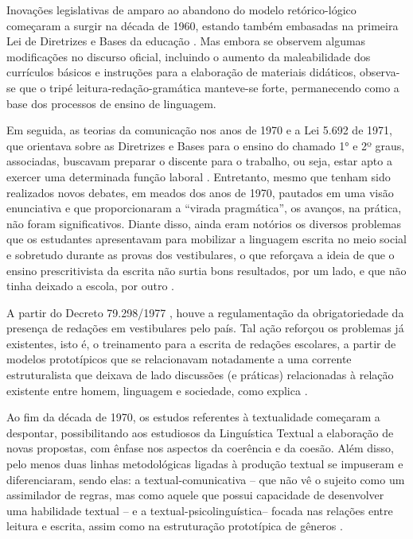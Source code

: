 \documentclass[portuguese]{textolivre}
\begin{document}
Inovações legislativas de amparo ao abandono do modelo retórico-lógico começaram a surgir na década de 1960, estando também embasadas na primeira Lei de Diretrizes e Bases da educação \cite{brasil_lei_1961}. Mas embora se observem algumas modificações no discurso oficial, incluindo o aumento da maleabilidade dos currículos básicos e instruções para a elaboração de materiais didáticos, observa-se que o tripé leitura-redação-gramática manteve-se forte, permanecendo como a base dos processos de ensino de linguagem.  

Em seguida, as teorias da comunicação nos anos de 1970 e a Lei 5.692 de 1971, que orientava sobre as Diretrizes e Bases para o ensino do chamado 1° e 2º graus, associadas, buscavam preparar o discente para o trabalho, ou seja, estar apto a exercer uma determinada função laboral \cite{vicentini_redaco_2015}. Entretanto, mesmo que tenham sido realizados novos debates, em meados dos anos de 1970, pautados em uma visão enunciativa e que proporcionaram a “virada pragmática”, os avanços, na prática, não foram significativos. Diante disso, ainda eram notórios os diversos problemas que os estudantes apresentavam para mobilizar a linguagem escrita no meio social e sobretudo durante as provas dos vestibulares, o que reforçava a ideia de que o ensino prescritivista da escrita não surtia bons resultados, por um lado, e que não tinha deixado a escola, por outro \cite{bonini_metodologias_2002}.

A partir do Decreto 79.298/1977 \cite{brasil_decreto_1977}, houve a regulamentação da obrigatoriedade da presença de redações em vestibulares pelo país. Tal ação reforçou os problemas já existentes, isto é, o treinamento para a escrita de redações escolares, a partir de modelos prototípicos que se relacionavam notadamente a uma corrente estruturalista que deixava de lado discussões (e práticas) relacionadas à relação existente entre homem, linguagem e sociedade, como explica \textcite{bunzen_da_2006}. 

Ao fim da década de 1970, os estudos referentes à textualidade começaram a despontar, possibilitando aos estudiosos da Linguística Textual a elaboração de novas propostas, com ênfase nos aspectos da coerência e da coesão. Além disso, pelo menos duas linhas metodológicas ligadas à produção textual se impuseram e diferenciaram, sendo elas: a textual-comunicativa – que não vê o sujeito como um assimilador de regras, mas como aquele que possui capacidade de desenvolver uma habilidade textual – e a textual-psicolinguística– focada nas relações entre leitura e escrita, assim como na estruturação prototípica de gêneros \cite{bonini_metodologias_2002}.
\end{document}
